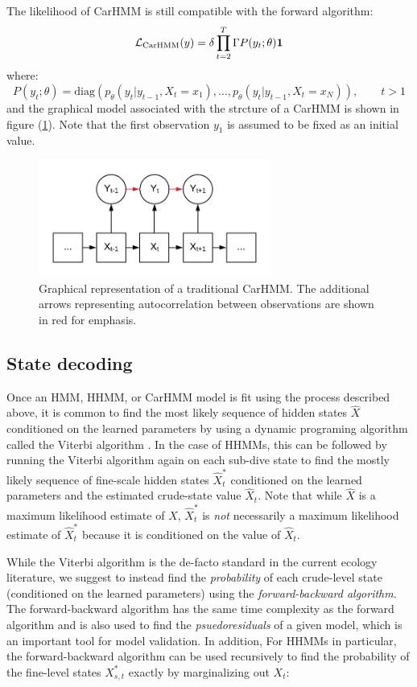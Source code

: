 The likelihood of CarHMM is still compatible with the forward algorithm:
\begin{equation}
\mathcal{L}_{\text{CarHMM}}(y) = \delta \prod_{t=2}^T \Gamma P(y_t;\theta) \mathbf{1}
\label{CarHMM_likelihood}
\end{equation}
where:
%
$$P(y_t;\theta) = \text{diag}(p_\theta(y_t|y_{t-1},X_t = x_1), . . . , p_\theta(y_t|y_{t-1},X_t = x_N )), \qquad t > 1$$
%
and the graphical model associated with the strcture of a CarHMM is shown in figure (\ref{fig:CarHMM}). Note that the first observation $y_1$ is assumed to be fixed as an initial value.

\begin{figure}[h!]
	\centering
	\includegraphics[width=3in]{../Plots/CarHMM.png}
	\caption{Graphical representation of a traditional CarHMM. The additional arrows representing autocorrelation between observations are shown in red for emphasis.}
	\label{fig:CarHMM}
\end{figure}



\subsection{State decoding}

Once an HMM, HHMM, or CarHMM model is fit using the process described above, it is common to find the most likely sequence of hidden states $\hat X$ conditioned on the learned parameters by using a dynamic programing algorithm called the Viterbi algorithm \cite{Viterbi:1967}. In the case of HHMMs, this can be followed by running the Viterbi algorithm again on each sub-dive state to find the mostly likely sequence of fine-scale hidden states $\hat X_t^*$ conditioned on the learned parameters and the estimated crude-state value $\hat X_t$. Note that while $\hat X$ is a maximum likelihood estimate of $X$, $\hat X^*_t$ is \textit{not} necessarily a maximum likelihood estimate of $\hat X^*_t$ because it is conditioned on the value of $\hat X_t$.

While the Viterbi algorithm is the de-facto standard in the current ecology literature, we suggest to instead find the \textit{probability} of each crude-level state (conditioned on the learned parameters) using the \textit{forward-backward algorithm}. The forward-backward algorithm has the same time complexity as the forward algorithm and is also used to find the \textit{psuedoresiduals} of a given model, which is an important tool for model validation. In addition, For HHMMs in particular, the forward-backward algorithm can be used recursively to find the probability of the fine-level states $X^*_{s,t}$ exactly by marginalizing out $X_t$:

